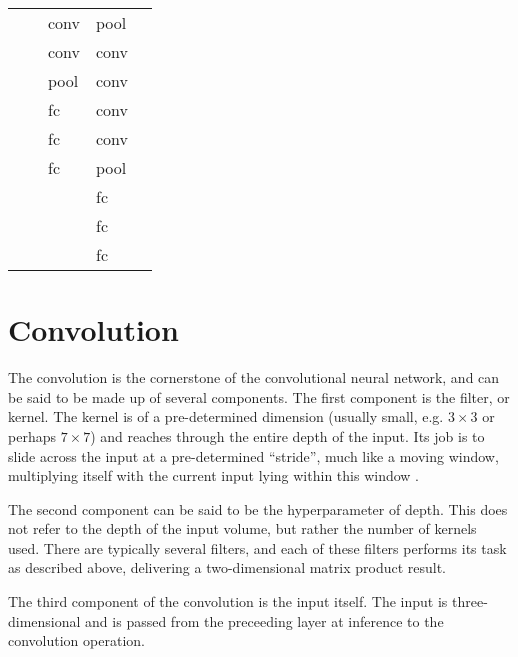 \begin{table}[]
\begin{tabular}{|l|l|l|l|l}
                &       						& conv                    & pool                    &  \\ \cline{1-4}
                &       						& conv                    & conv                    &  \\ \cline{1-4}
                &       						& pool                    & conv                    &  \\ \cline{1-4}
                &       						& fc                      & conv                    &  \\ \cline{1-4}
                &       						& fc                      & conv                    &  \\ \cline{1-4}
                &       						& fc                      & pool                    &  \\ \cline{1-4}
                &       						&                         & fc                      &  \\ \cline{1-4}
                &       						&                         & fc                      &  \\ \cline{1-4}
                &       						&                         & fc                      &  \\ \cline{1-4}
\end{tabular}
\end{table}

\section{Convolution}
The convolution is the cornerstone of the convolutional neural network, and can be said to be made up of several components. The first component is the filter, or kernel. The kernel is of a pre-determined dimension (usually small, e.g. $3\times3$ or perhaps $7\times7$) and reaches through the entire depth of the input. Its job is to slide across the input at a pre-determined ``stride'', much like a moving window, multiplying itself with the current input lying within this window \cite{convnets}.

The second component can be said to be the hyperparameter of depth. This does not refer to the depth of the input volume, but rather the number of kernels used. There are typically several filters, and each of these filters performs its task as described above, delivering a two-dimensional matrix product result.

The third component of the convolution is the input itself. The input is three-dimensional and is passed from the preceeding layer at inference to the convolution operation.

